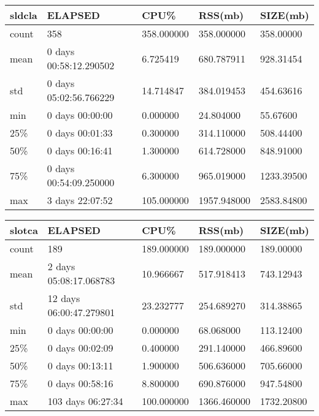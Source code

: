 \documentclass{article}
\begin{document}
\begin{table}[H]
\begin{tabular}{|l|l|l|l|l|}
\hline sldcla& ELAPSED&   CPU\%&  RSS(mb)&   SIZE(mb) \\
\hline count&    358& 358.000000&  358.000000&  358.00000 \\
\hline mean&  0 days 00:58:12.290502&  6.725419&  680.787911&  928.31454 \\
\hline std&  0 days 05:02:56.766229&  14.714847&  384.019453&  454.63616 \\
\hline min&   0 days 00:00:00&  0.000000&  24.804000&  55.67600 \\
\hline 25\%&   0 days 00:01:33&  0.300000&  314.110000&  508.44400 \\
\hline 50\%&   0 days 00:16:41&  1.300000&  614.728000&  848.91000 \\
\hline 75\%&  0 days 00:54:09.250000&  6.300000&  965.019000& 1233.39500 \\
\hline max&   3 days 22:07:52& 105.000000& 1957.948000& 2583.84800 \\
\hline 
\end{tabular}
\label{TABLE-SessionSizesldcla}
\end{table}

\begin{table}[H]
\begin{tabular}{|l|l|l|l|l|}
\hline slotca&    ELAPSED&   CPU\%&  RSS(mb)&   SIZE(mb) \\
\hline count&   189& 189.000000&  189.000000&  189.00000 \\
\hline mean&  2 days 05:08:17.068783&  10.966667&  517.918413&  743.12943 \\
\hline std&  12 days 06:00:47.279801&  23.232777&  254.689270&  314.38865 \\
\hline min&   0 days 00:00:00&  0.000000&  68.068000&  113.12400 \\
\hline 25\%&   0 days 00:02:09&  0.400000&  291.140000&  466.89600 \\
\hline 50\%&   0 days 00:13:11&  1.900000&  506.636000&  705.66000 \\
\hline 75\%&   0 days 00:58:16&  8.800000&  690.876000&  947.54800 \\
\hline max&  103 days 06:27:34& 100.000000& 1366.460000& 1732.20800 \\
\hline 
\end{tabular}
\label{TABLE-SessionSizeslotca}
\end{table}
\end{document}

